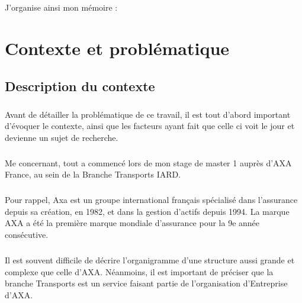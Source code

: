 \documentclass[12pt, a4paper, oneside]{book}
\begin{document}
\paragraph{}
J'organise ainsi mon mémoire : 


\chapter{Contexte et problématique}
\section{Description du contexte}

\paragraph{}

Avant de détailler la problématique de ce travail, il est tout d'abord important d'évoquer le contexte, ainsi que les facteurs ayant fait que celle ci voit le jour et devienne un sujet de recherche.

\paragraph{}

Me concernant, tout a commencé lors de mon stage de master 1 auprès d'AXA France, au sein de la Branche Transports IARD.


\paragraph{}

Pour rappel, Axa est un groupe international français spécialisé dans l'assurance depuis sa création, en 1982, et dans la gestion d'actifs depuis 1994. La marque AXA a été la première marque mondiale d'assurance pour la 9e année consécutive.


\paragraph{}

Il est souvent difficile de décrire l'organigramme d'une structure aussi
grande et complexe que celle d'AXA. Néanmoins, il est important de préciser que la branche Transports est un service faisant partie de l'organisation d'Entreprise d'AXA.

\paragraph{}
\end{document}
